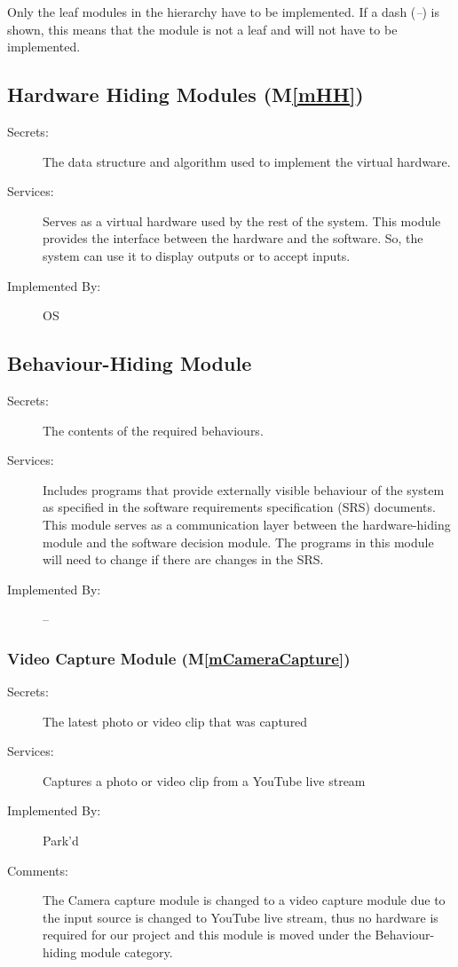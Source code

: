 \documentclass[12pt, titlepage]{article}
\newcommand{\mref}[1]{M\ref{#1}}
\begin{document}
Only the leaf modules in the hierarchy have to be implemented. If a dash
(\emph{--}) is shown, this means that the module is not a leaf and will not have
to be implemented.

\subsection{Hardware Hiding Modules (\mref{mHH})}

\begin{description}
\item[Secrets:]The data structure and algorithm used to implement the virtual
  hardware.
\item[Services:]Serves as a virtual hardware used by the rest of the system.
  This module provides the interface between the hardware and the software. So,
  the system can use it to display outputs or to accept inputs.
\item[Implemented By:] OS
\end{description}



\subsection{Behaviour-Hiding Module}





\begin{description}
\item[Secrets:]The contents of the required behaviours.
\item[Services:]Includes programs that provide externally visible behaviour of
  the system as specified in the software requirements specification (SRS)
  documents. This module serves as a communication layer between the
  hardware-hiding module and the software decision module. The programs in this
  module will need to change if there are changes in the SRS.
\item[Implemented By:] --
\end{description}

\color{red}
\subsubsection{Video Capture Module (\mref{mCameraCapture})}
\begin{description}
\item[Secrets:] The latest photo or video clip that was captured
\item[Services:] Captures a photo or video clip from a YouTube live stream
\item[Implemented By:] Park'd
\item[Comments:]The Camera capture module is changed to a video capture module
due to the input source is changed to YouTube live stream, thus no hardware is
required for our project and this module is moved under the Behaviour-hiding
module category.
\end{description}
\end{document}
